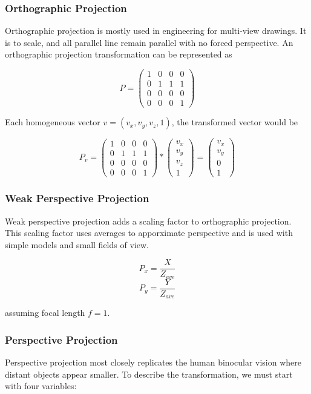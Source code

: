 \documentclass{article}
\begin{document}
\subsubsection{Orthographic Projection}
Orthographic projection is mostly used in engineering for multi-view drawings. It is to scale, and all parallel line remain parallel with no forced perspective. An orthographic projection transformation can be represented as

\[ P = \begin{pmatrix}
  1 & 0 & 0 & 0 \\
  0 & 1 & 1 & 1 \\
  0 & 0 & 0 & 0 \\
  0 & 0 & 0 & 1 
 \end{pmatrix}\]	

Each homogeneous vector $v = (v_x, v_y, v_z, 1)$, the transformed vector would be

\[P_{v} = \begin{pmatrix}
  1 & 0 & 0 & 0 \\
  0 & 1 & 1 & 1 \\
  0 & 0 & 0 & 0 \\
  0 & 0 & 0 & 1 
 \end{pmatrix}	
*
\begin{pmatrix}
  v_{x} \\
  v_{y} \\
  v_{z} \\
  1
 \end{pmatrix}	
=
\begin{pmatrix}
  v_{x} \\
  v_{y} \\
  0 \\
  1
 \end{pmatrix}\]

\subsubsection{Weak Perspective Projection}
Weak perspective projection adds a scaling factor to orthographic projection. This scaling factor uses averages to apporximate perspective and is used with simple models and small fields of view.

  \[P_{x} =  \frac{X}{Z_{ave}}\]
  \[P_{y} =  \frac{Y}{Z_{ave}}\]

assuming focal length $f = 1$.

\subsubsection{Perspective Projection}
Perspective projection most closely replicates the human binocular vision where distant objects appear smaller. To describe the transformation, we must start with four variables:
\end{document}
